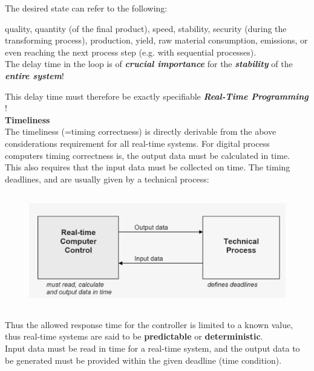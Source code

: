 The desired state can refer to the following:

quality, quantity (of the final product), speed, stability, security (during the transforming process), production, yield, raw material consumption, emissions, or even reaching the next process step (e.g. with sequential processes).\\

The delay time in the loop is of \textbf{\textit{crucial importance}} for the \textbf{\textit{stability}} of the \textbf{\textit{entire system}}!

This delay time must therefore be exactly specifiable  \textbf{\textit{Real-Time Programming}} !\\

{\rot\bf Timeliness}\\

The timeliness (=timing correctness) is directly derivable from the above considerations requirement for all real-time systems. For digital process computers timing correctness is, the output data must be calculated in time.\\

This also requires that the input data must be collected on time. The timing deadlines, and are usually given by a technical process:\\

\begin{figure}[h]
    \centering
    \includegraphics[width=12cm, height=5cm]{Images/image61.png}
    \label{fig:Fig 3}
\end{figure}

Thus the allowed response time for the controller is limited to a known value, thus real-time systems are said to be \textbf{predictable} or \textbf{deterministic}.\\

Input data must be read in time for a real-time system, and the output data to be generated must be provided within the given deadline (time condition). \\

